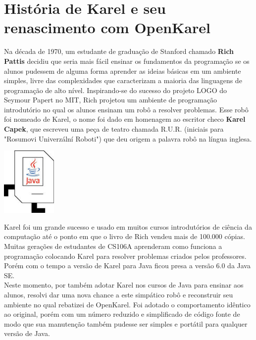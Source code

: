 \documentclass[a4paper,11pt]{article}
\begin{document}
\section{História de Karel e seu renascimento com OpenKarel}
Na década de 1970, um estudante de graduação de Stanford chamado \textbf{Rich Pattis} decidiu que seria mais fácil ensinar os fundamentos da programação se os alunos pudessem de alguma forma aprender as ideias básicas em um ambiente simples, livre das complexidades que caracterizam a maioria das linguagens de programação de alto nível. Inspirando-se do sucesso do projeto LOGO do Seymour Papert no MIT, Rich projetou um ambiente de programação introdutório no qual os alunos ensinam um robô a resolver problemas. Esse robô foi nomeado de Karel, o nome foi dado em homenagem ao escritor checo \textbf{Karel Capek}, que escreveu uma peça de teatro chamada R.U.R. (iniciais para "Rosumovi Univerzální Roboti"\cite{rur}) que deu origem a palavra robô na língua inglesa.
\begin{center} 
\includegraphics[width=0.2\textwidth]{logokarel.jpg} 
\end{center}
Karel foi um grande sucesso e usado em muitos cursos introdutórios de ciência da computação até o ponto em que o livro de Rich vendeu mais de 100.000 cópias. Muitas gerações de estudantes de CS106A\cite{cs106a} aprenderam como funciona a programação colocando Karel para resolver problemas criados pelos professores. Porém com o tempo a versão de Karel para Java ficou presa a versão 6.0 da Java SE. \\[3mm]
Neste momento, por também adotar Karel nos cursos de Java para ensinar aos alunos, resolvi dar uma nova chance a este simpático robô e reconstruir seu ambiente no qual rebatizei de OpenKarel\cite{openkareloficial}. Foi adotado o comportamento idêntico ao original, porém com um número reduzido e simplificado de código fonte de modo que sua manutenção também pudesse ser simples e portátil para qualquer versão de Java.
\end{document}
